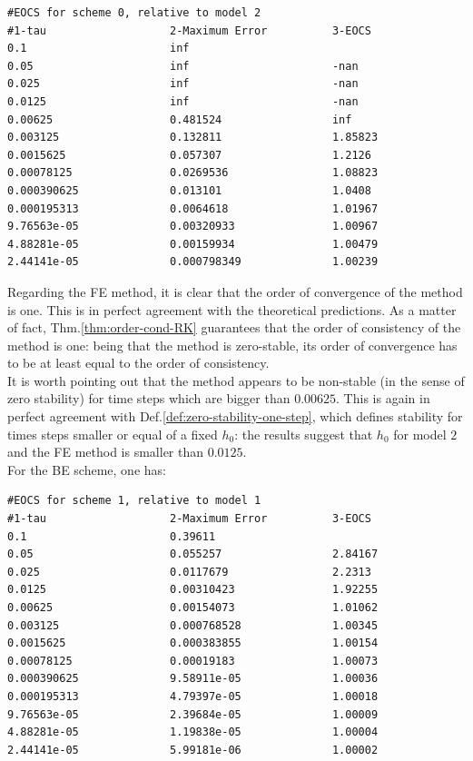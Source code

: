 \documentclass[11pt]{article}
\theoremstyle{theorem}
\theoremstyle{definition}
\begin{document}
\begin{lstlisting}
#EOCS for scheme 0, relative to model 2
#1-tau                   2-Maximum Error          3-EOCS                   
0.1                      inf                      	
0.05                     inf                      -nan
0.025                    inf                      -nan
0.0125                   inf                      -nan
0.00625                  0.481524                 inf
0.003125                 0.132811                 1.85823
0.0015625                0.057307                 1.2126
0.00078125               0.0269536                1.08823
0.000390625              0.013101                 1.0408
0.000195313              0.0064618                1.01967
9.76563e-05              0.00320933               1.00967
4.88281e-05              0.00159934               1.00479
2.44141e-05              0.000798349              1.00239
\end{lstlisting}

Regarding the FE method, it is clear that the order of convergence of the method is one. This is in perfect agreement with the theoretical predictions. As a matter of fact, Thm.\ref{thm:order-cond-RK} guarantees that the order of consistency of the method is one: being that the method is zero-stable, its order of convergence has to be at least equal to the order of consistency.\\
It is worth pointing out that the method appears to be non-stable (in the sense of zero stability) for time steps which are bigger than $0.00625$. This is again in perfect agreement with Def.\ref{def:zero-stability-one-step}, which defines stability for times steps smaller or equal of a fixed $h_0$: the results suggest that $h_0$ for model $2$ and the FE method is smaller than $0.0125$.\\

For the BE scheme, one has:

\begin{lstlisting}
#EOCS for scheme 1, relative to model 1
#1-tau                   2-Maximum Error          3-EOCS                   
0.1                      0.39611                  	
0.05                     0.055257                 2.84167
0.025                    0.0117679                2.2313
0.0125                   0.00310423               1.92255
0.00625                  0.00154073               1.01062
0.003125                 0.000768528              1.00345
0.0015625                0.000383855              1.00154
0.00078125               0.00019183               1.00073
0.000390625              9.58911e-05              1.00036
0.000195313              4.79397e-05              1.00018
9.76563e-05              2.39684e-05              1.00009
4.88281e-05              1.19838e-05              1.00004
2.44141e-05              5.99181e-06              1.00002
\end{lstlisting}
\end{document}
